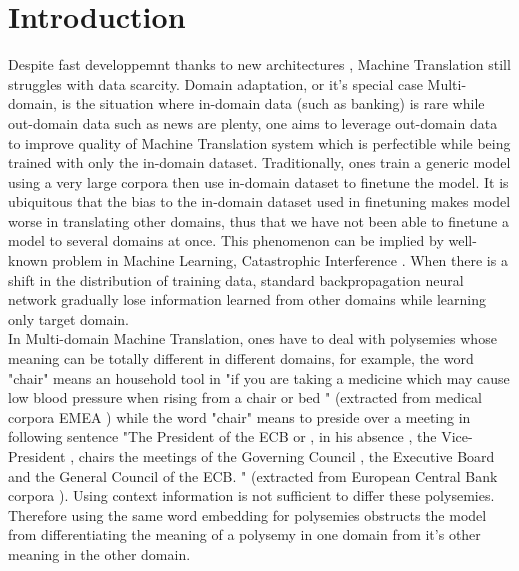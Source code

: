 \documentclass[11pt,a4paper]{article}
\begin{document}
\section{Introduction}
Despite fast developpemnt thanks to new architectures \cite{NIPS2017_7181} \cite{bahdanau2014neural} \cite{D13-1176} \cite{Sutskever2014Sequence}, Machine Translation still struggles with data scarcity. Domain adaptation, or it's special case Multi-domain, is the situation where in-domain data (such as banking) is rare while out-domain data such as news are plenty, one aims to leverage out-domain data to improve quality of Machine Translation system which is perfectible while being trained with only the in-domain dataset. Traditionally, ones train a generic model using a very large corpora then use in-domain dataset to finetune the model. It is ubiquitous that the bias to the in-domain dataset used in finetuning makes model worse in translating other domains, thus that we have not been able to finetune a model to several domains at once. This phenomenon can be implied by well-known problem in Machine Learning, Catastrophic Interference \cite{Michael1989Catastrophic}. When there is a shift in the distribution of training data, standard backpropagation neural network gradually lose information learned from other domains while learning only target domain.\\
In Multi-domain Machine Translation, ones have to deal with polysemies whose meaning can be totally different in different domains, for example, the word "chair" means an household tool in "if you are taking a medicine which may cause low blood pressure when rising from a chair or bed " (extracted from medical corpora EMEA \cite{Tiedemann2009RANLP5}) while the word "chair" means to preside over a meeting in following sentence "The President of the ECB or , in his absence , the Vice-President , chairs the meetings of the Governing Council , the Executive Board and the General Council of the ECB. " (extracted from European Central Bank corpora \cite{Tiedemann2009RANLP5}). Using context information is not sufficient to differ these polysemies. Therefore using the same word embedding for polysemies obstructs the model from differentiating the meaning of a polysemy in one domain from it's other meaning in the other domain. \\
\begin{table}[h]
\caption{Polysemies}
\label{table:polysemy}
\end{table}
\end{document}
